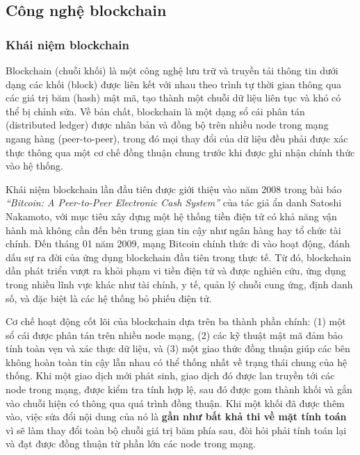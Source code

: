 \subsection{Công nghệ blockchain}
\label{sec:cong-nghe-blockchain}

\subsubsection{Khái niệm blockchain}

Blockchain (chuỗi khối) là một công nghệ lưu trữ và truyền tải thông tin dưới dạng các khối (block) được liên kết với nhau theo trình tự thời gian thông qua các giá trị băm (hash) mật mã, tạo thành một chuỗi dữ liệu liên tục và khó có thể bị chỉnh sửa. Về bản chất, blockchain là một dạng sổ cái phân tán (distributed ledger) được nhân bản và đồng bộ trên nhiều node trong mạng ngang hàng (peer-to-peer), trong đó mọi thay đổi của dữ liệu đều phải được xác thực thông qua một cơ chế đồng thuận chung trước khi được ghi nhận chính thức vào hệ thống.

Khái niệm blockchain lần đầu tiên được giới thiệu vào năm 2008 trong bài báo \textit{``Bitcoin: A Peer-to-Peer Electronic Cash System''} của tác giả ẩn danh Satoshi Nakamoto, với mục tiêu xây dựng một hệ thống tiền điện tử có khả năng vận hành mà không cần đến bên trung gian tin cậy như ngân hàng hay tổ chức tài chính. Đến tháng 01 năm 2009, mạng Bitcoin chính thức đi vào hoạt động, đánh dấu sự ra đời của ứng dụng blockchain đầu tiên trong thực tế. Từ đó, blockchain dần phát triển vượt ra khỏi phạm vi tiền điện tử và được nghiên cứu, ứng dụng trong nhiều lĩnh vực khác như tài chính, y tế, quản lý chuỗi cung ứng, định danh số, và đặc biệt là các hệ thống bỏ phiếu điện tử.

Cơ chế hoạt động cốt lõi của blockchain dựa trên ba thành phần chính: (1) một sổ cái được phân tán trên nhiều node mạng, (2) các kỹ thuật mật mã đảm bảo tính toàn vẹn và xác thực dữ liệu, và (3) một giao thức đồng thuận giúp các bên không hoàn toàn tin cậy lẫn nhau có thể thống nhất về trạng thái chung của hệ thống. Khi một giao dịch mới phát sinh, giao dịch đó được lan truyền tới các node trong mạng, được kiểm tra tính hợp lệ, sau đó được gom thành khối và gắn vào chuỗi hiện có thông qua quá trình đồng thuận. Khi một khối đã được thêm vào, việc sửa đổi nội dung của nó là \textbf{gần như bất khả thi về mặt tính toán} vì sẽ làm thay đổi toàn bộ chuỗi giá trị băm phía sau, đòi hỏi phải tính toán lại và đạt được đồng thuận từ phần lớn các node trong mạng.

